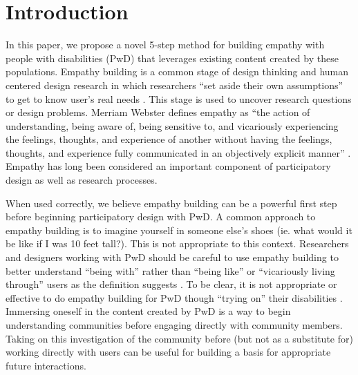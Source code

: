 \section{Introduction}
In this paper, we propose a novel 5-step method for building empathy with people with disabilities (PwD) that leverages existing content created by these populations. Empathy building is a common stage of design thinking and human centered design research in which researchers ``set aside their own assumptions'' to get to know user's real needs \cite{plattnerDesignThinkingUnderstand2011,wrightEmpathyExperienceHCI2008}. This stage is used to uncover research questions or design problems. Merriam Webster defines empathy as ``the action of understanding, being aware of, being sensitive to, and vicariously experiencing the feelings, thoughts, and experience of another without having the feelings, thoughts, and experience fully communicated in an objectively explicit manner'' \cite{inc.MeriamWebsterDictionaryDefinition2004}.  Empathy has long been considered an important component of participatory design as well as research processes. %

When used correctly, we believe empathy building can be a powerful first step before beginning participatory design with PwD. A common approach to empathy building is to imagine yourself in someone else's shoes (ie. what would it be like if I was 10 feet tall?). This is not appropriate to this context. Researchers and designers working with PwD should be careful to use empathy building to better understand ``being with'' rather than ``being like'' or ``vicariously living through'' users as the definition suggests \cite{bennettPromiseEmpathyDesign2019}. To be clear, it is not appropriate or effective to do empathy building for PwD though ``trying on'' their disabilities \cite{abreuWhyWonTry2018}.  Immersing oneself in the content created by PwD is a way to begin understanding communities before engaging directly with community members. Taking on this investigation of the community before (but not as a substitute for) working directly with users can be useful for building a basis for appropriate future interactions. 

